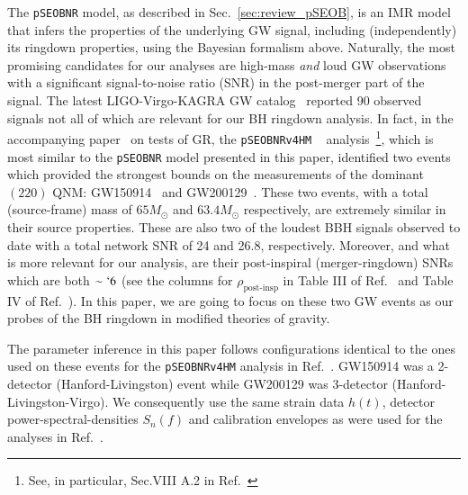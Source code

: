 \documentclass[twocolumn,
               prd,
               aps,
               superscriptaddress,
               tightenlines,
               nofootinbib,
               eqsecnum,
               amsfonts,
               amsmath,
               longbibliography]{revtex4-1}
\newcommand{\Mo}{M_{\odot}}
\newcommand{\pSEOB}{\texttt{pSEOBNR}}
\begin{document}
The \pSEOB{} model, as described in Sec.~\ref{sec:review_pSEOB}, is an
IMR model that infers the properties of the underlying GW signal,
including (independently) its ringdown properties, using the Bayesian formalism
above. Naturally, the most promising candidates for our analyses are high-mass
\emph{and} loud GW observations with a significant signal-to-noise ratio (SNR)
in the post-merger part of the signal.
%
The latest LIGO-Virgo-KAGRA GW catalog~\cite{LIGOScientific:2021djp} reported 90 observed
signals not all of which are relevant for our BH ringdown analysis. In fact, in
the accompanying paper~\cite{LIGOScientific:2021sio} on tests of GR, the \texttt{pSEOBNRv4HM}
~\cite{Brito:2018rfr,Ghosh:2021mrv} analysis~\footnote{See, in particular, Sec.VIII A.2
in Ref.~\cite{LIGOScientific:2021sio}}, which is most similar to the \pSEOB{} model
presented in this paper, identified two events which provided the strongest
bounds on the measurements of the dominant $(220)$ QNM:
GW150914~\cite{LIGOScientific:2016aoc} and
GW200129~\cite{LIGOScientific:2021djp}.
%
These two events, with a total (source-frame) mass of $65 \Mo$ and $63.4 \Mo$ respectively, are
extremely similar in their source properties. These are also two of the loudest
BBH signals observed to date with a total network SNR of 24 and 26.8,
respectively.
%
Moreover, and what is more relevant for our analysis, are their post-inspiral
(merger-ringdown) SNRs which are both $\sim `6$ (see the columns for
$\rho_{\text{post-insp}}$ in Table III of Ref.~\cite{LIGOScientific:2019fpa} and
Table IV of Ref.~\cite{LIGOScientific:2021sio}).
%
In this paper, we are going to focus on these two GW events as our probes of
the BH ringdown in modified theories of gravity.

The parameter inference in this paper follows configurations identical to the
ones used on these events for the \texttt{pSEOBNRv4HM} analysis in
Ref.~\cite{LIGOScientific:2021sio}. GW150914 was a 2-detector (Hanford-Livingston) event while
GW200129 was 3-detector (Hanford-Livingston-Virgo).
%
We consequently use the same strain data $h(t)$, detector
power-spectral-densities $S_n(f)$ and calibration envelopes as were used for
the analyses in Ref.~\cite{LIGOScientific:2021sio}.
%
%
\end{document}
